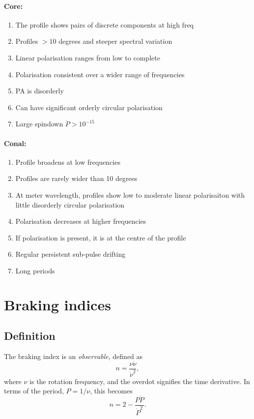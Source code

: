 \documentclass{book}
\begin{document}
\paragraph{Core:}
\begin{enumerate}
    \item The profile shows pairs of discrete components at high freq
    \item Profiles $>10$ degrees and steeper spectral variation
    \item Linear polarisation ranges from low to complete
    \item Polarisation consistent over a wider range of frequencies
    \item PA is disorderly
    \item Can have significant orderly circular polarisation
    \item Large spindown $\dot{P} > 10^{-15}$
\end{enumerate}

\paragraph{Conal:}
\begin{enumerate}
\item Profile broadens at low frequencies
\item Profiles are rarely wider than 10 degrees
\item At meter wavelength, profiles show low to moderate linear polarisaiton with little disorderly circular polarisation
\item Polarisation decreases at higher frequencies
\item If polarisation is present, it is at the centre of the profile
\item Regular persistent sub-pulse drifting
\item Long periods
\end{enumerate}


\section{Braking indices}

\subsection{Definition}

The braking index is an \emph{observable}, defined as
\begin{equation}
  n = \frac{\nu\ddot{\nu}}{\dot{\nu}^2},
\end{equation}
where $\nu$ is the rotation frequency, and the overdot signifies the time derivative.
In terms of the period, $P = 1/\nu$, this becomes
\begin{equation}
    n = 2 - \frac{P\ddot{P}}{\dot{P}^2}.
\end{equation}
\end{document}
